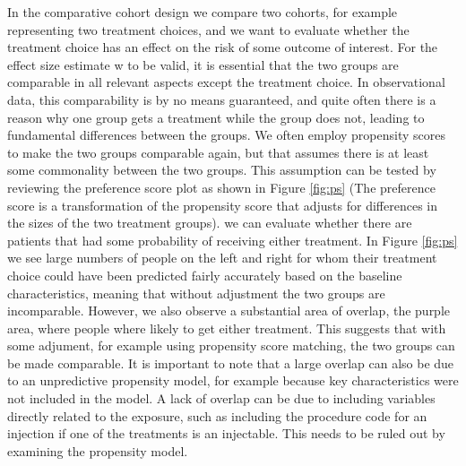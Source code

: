 \documentclass[]{book}
\begin{document}
In the comparative cohort design we compare two cohorts, for example
representing two treatment choices, and we want to evaluate whether the
treatment choice has an effect on the risk of some outcome of interest.
For the effect size estimate w to be valid, it is essential that the two
groups are comparable in all relevant aspects except the treatment
choice. In observational data, this comparability is by no means
guaranteed, and quite often there is a reason why one group gets a
treatment while the group does not, leading to fundamental differences
between the groups. We often employ propensity scores to make the two
groups comparable again, but that assumes there is at least some
commonality between the two groups. This assumption can be tested by
reviewing the preference score plot as shown in Figure \ref{fig:ps} (The
preference score is a transformation of the propensity score that
adjusts for differences in the sizes of the two treatment groups). we
can evaluate whether there are patients that had some probability of
receiving either treatment. In Figure \ref{fig:ps} we see large numbers
of people on the left and right for whom their treatment choice could
have been predicted fairly accurately based on the baseline
characteristics, meaning that without adjustment the two groups are
incomparable. However, we also observe a substantial area of overlap,
the purple area, where people where likely to get either treatment. This
suggests that with some adjument, for example using propensity score
matching, the two groups can be made comparable. It is important to note
that a large overlap can also be due to an unpredictive propensity
model, for example because key characteristics were not included in the
model. A lack of overlap can be due to including variables directly
related to the exposure, such as including the procedure code for an
injection if one of the treatments is an injectable. This needs to be
ruled out by examining the propensity model.
\end{document}

